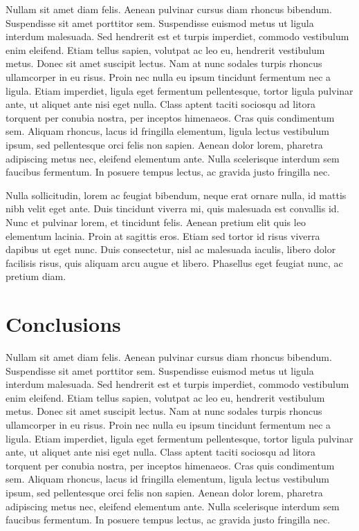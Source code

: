 Nullam sit amet diam felis. Aenean pulvinar cursus diam rhoncus bibendum.
Suspendisse sit amet porttitor sem.  Suspendisse euismod metus ut ligula
interdum malesuada.  Sed hendrerit est et turpis imperdiet, commodo
vestibulum enim eleifend.  Etiam tellus sapien, volutpat ac leo eu,
hendrerit vestibulum metus.  Donec sit amet suscipit lectus.  Nam at nunc
sodales turpis rhoncus ullamcorper in eu risus.  Proin nec nulla eu ipsum
tincidunt fermentum nec a ligula.  Etiam imperdiet, ligula eget fermentum
pellentesque, tortor ligula pulvinar ante, ut aliquet ante nisi eget nulla. 
Class aptent taciti sociosqu ad litora torquent per conubia nostra, per
inceptos himenaeos.  Cras quis condimentum sem.  Aliquam rhoncus, lacus id
fringilla elementum, ligula lectus vestibulum ipsum, sed pellentesque orci
felis non sapien.  Aenean dolor lorem, pharetra adipiscing metus nec,
eleifend elementum ante.  Nulla scelerisque interdum sem faucibus fermentum. 
In posuere tempus lectus, ac gravida justo fringilla nec.

Nulla sollicitudin, lorem ac feugiat bibendum, neque erat ornare nulla, id
mattis nibh velit eget ante.  Duis tincidunt viverra mi, quis malesuada est
convallis id.  Nunc et pulvinar lorem, et tincidunt felis.  Aenean pretium
elit quis leo elementum lacinia.  Proin at sagittis eros.  Etiam sed tortor
id risus viverra dapibus ut eget nunc.  Duis consectetur, nisl ac malesuada
iaculis, libero dolor facilisis risus, quis aliquam arcu augue et libero. 
Phasellus eget feugiat nunc, ac pretium diam.

\section{Conclusions}
\label{sec:studytwo:conclusions}

Nullam sit amet diam felis. Aenean pulvinar cursus diam rhoncus bibendum.
Suspendisse sit amet porttitor sem.  Suspendisse euismod metus ut ligula
interdum malesuada.  Sed hendrerit est et turpis imperdiet, commodo
vestibulum enim eleifend.  Etiam tellus sapien, volutpat ac leo eu,
hendrerit vestibulum metus.  Donec sit amet suscipit lectus.  Nam at nunc
sodales turpis rhoncus ullamcorper in eu risus.  Proin nec nulla eu ipsum
tincidunt fermentum nec a ligula.  Etiam imperdiet, ligula eget fermentum
pellentesque, tortor ligula pulvinar ante, ut aliquet ante nisi eget nulla. 
Class aptent taciti sociosqu ad litora torquent per conubia nostra, per
inceptos himenaeos.  Cras quis condimentum sem.  Aliquam rhoncus, lacus id
fringilla elementum, ligula lectus vestibulum ipsum, sed pellentesque orci
felis non sapien.  Aenean dolor lorem, pharetra adipiscing metus nec,
eleifend elementum ante.  Nulla scelerisque interdum sem faucibus fermentum. 
In posuere tempus lectus, ac gravida justo fringilla nec.
